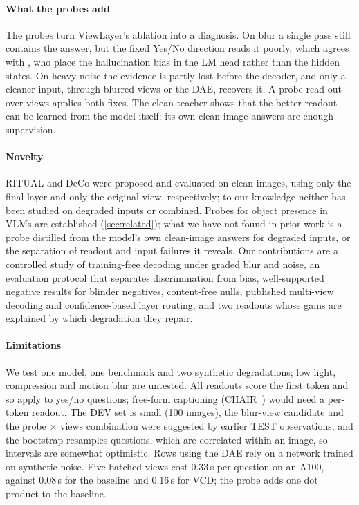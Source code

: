 \documentclass[10pt,a4paper]{article}
\newcommand{\ours}{ViewLayer}
\begin{document}
\paragraph{What the probes add} The probes turn \ours{}'s ablation into a diagnosis. On blur a single pass still contains the answer, but the fixed Yes/No direction reads it poorly, which agrees with \citet{li2025trainingbias}, who place the hallucination bias in the LM head rather than the hidden states. On heavy noise the evidence is partly lost before the decoder, and only a cleaner input, through blurred views or the DAE, recovers it. A probe read out over views applies both fixes. The clean teacher shows that the better readout can be learned from the model itself: its own clean-image answers are enough supervision.

\paragraph{Novelty} RITUAL and DeCo were proposed and evaluated on clean images, using only the final layer and only the original view, respectively; to our knowledge neither has been studied on degraded inputs or combined. Probes for object presence in VLMs are established (\cref{sec:related}); what we have not found in prior work is a probe distilled from the model's own clean-image answers for degraded inputs, or the separation of readout and input failures it reveals. Our contributions are a controlled study of training-free decoding under graded blur and noise, an evaluation protocol that separates discrimination from bias, well-supported negative results for blinder negatives, content-free nulls, published multi-view decoding and confidence-based layer routing, and two readouts whose gains are explained by which degradation they repair.

\paragraph{Limitations} We test one model, one benchmark and two synthetic degradations; low light, compression and motion blur are untested. All readouts score the first token and so apply to yes/no questions; free-form captioning (CHAIR~\citep{rohrbach2018chair}) would need a per-token readout. The DEV set is small (100 images), the blur-view candidate and the probe $\times$ views combination were suggested by earlier TEST observations, and the bootstrap resamples questions, which are correlated within an image, so intervals are somewhat optimistic. Rows using the DAE rely on a network trained on synthetic noise. Five batched views cost 0.33\,s per question on an A100, against 0.08\,s for the baseline and 0.16\,s for VCD; the probe adds one dot product to the baseline.
\end{document}
